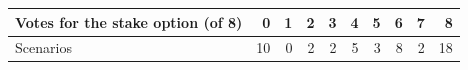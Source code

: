 \begin{tabular}{@{}lrrrrrrrrr@{}}
\toprule
Votes for the stake option (of 8) & 0 & 1 & 2 & 3 & 4 & 5 & 6 & 7 & 8 \\
\midrule
Scenarios & 10 & 0 & 2 & 2 & 5 & 3 & 8 & 2 & 18 \\
\bottomrule
\end{tabular}

